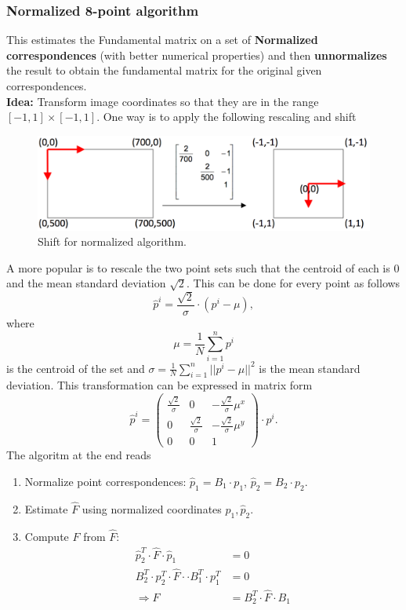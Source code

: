 \documentclass[a4paper,12 pt]{article}
\theoremstyle{definition}
\theoremstyle{remark}
\theoremstyle{definition}
\theoremstyle{definition}
\theoremstyle{definition}
\theoremstyle{remark}
\theoremstyle{definition}
\begin{document}
\subsubsection*{Normalized 8-point algorithm}
This estimates the Fundamental matrix on a set of \textbf{Normalized correspondences} (with better numerical properties) and then \textbf{unnormalizes} the result to obtain the fundamental matrix for the original given correspondences. \\
\textbf{Idea:} Transform image coordinates so that they are in the range $[-1,1]\times [-1,1]$. One way is to apply the following rescaling and shift
\begin{figure}[h!]
\begin{center}
\includegraphics[scale=0.3]{pics/shift}
\caption{Shift for normalized algorithm. \label{fig:shift}}
\end{center}
\end{figure}
A more popular is to rescale the two point sets such that the centroid of each is 0 and the mean standard deviation $\sqrt{2}$. This can be done for every point as follows
\begin{equation}
\hat{p}^i=\frac{\sqrt{2}}{\sigma}\cdot (p^i-\mu),
\end{equation}
where
\begin{equation}
\mu=\frac{1}{N}\sum_{i=1}^n p^i
\end{equation}
is the centroid of the set and $\sigma=\frac{1}{N}\sum_{i=1}^n ||p^i-\mu||^2$ is the mean standard deviation. This transformation can be expressed in matrix form
\begin{equation}
\hat{p}^i=\begin{pmatrix}
\frac{\sqrt{2}}{\sigma}&0&-\frac{\sqrt{2}}{\sigma}\mu^x\\
0&\frac{\sqrt{2}}{\sigma}&-\frac{\sqrt{2}}{\sigma}\mu^y\\
0&0&1
\end{pmatrix}\cdot p^i.
\end{equation}
The algoritm at the end reads
\begin{enumerate}
\item Normalize point correspondences: $\hat{p}_1=B_1\cdot p_1$, $\hat{p}_2=B_2\cdot p_2$.
\item Estimate $\hat{F}$ using normalized coordinates $\hat{p}_1,\hat{p}_2$.
\item Compute $F$ from $\hat{F}:$
\begin{equation}
\begin{split}
\hat{p}_2^T\cdot \hat{F}\cdot \hat{p}_1&=0\\
B_2^T\cdot p_2^{T}\cdot \hat{F}\cdot \cdot B_1^T\cdot p_1^T&=0\\
\Rightarrow F&=B_2^T\cdot \hat{F}\cdot B_1
\end{split}
\end{equation}
\end{enumerate}
\end{document}
